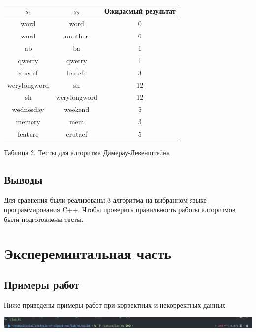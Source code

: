 \documentclass[a4paper,12pt]{article}
\begin{document}
\hfill

\begin{center}    
    \begin{tabular}{|c|c|c|}
        \hline
        $s_1$ & $s_2$ & Ожидаемый результат \\
        \hline
        word & word & 0 \\
        \hline
        word & another & 6 \\
        \hline
        ab & ba & 1 \\
        \hline
        qwerty & qwetry & 1 \\
        \hline
        abcdef & badcfe & 3 \\
        \hline
        werylongword & sh & 12 \\
        \hline
        sh & werylongword & 12 \\
        \hline
        wednesday & weekend & 5 \\
        \hline
        memory & mem & 3 \\
        \hline
        feature & erutaef & 5 \\
        \hline
    \end{tabular}

    Таблица 2. Тесты для алгоритма Дамерау-Левенштейна
\end{center}

\subsection{Выводы}

Для сравнения были реализованы 3 алгоритма на выбранном языке
программирования C++. Чтобы проверить правильность работы алгоритмов
были подготовлены тесты.

\newpage
\section{Экспереминтальная часть}

\subsection{Примеры работ}

Ниже приведены примеры работ при корректных и некорректных данных

\includegraphics[scale=0.35]{zero_arg}
\end{document}
